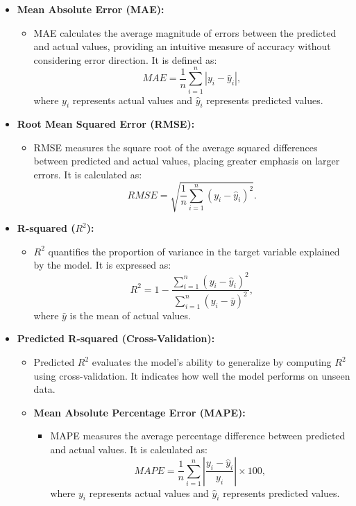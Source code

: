 \documentclass[10pt,twocolumn]{article}
\begin{document}
\begin{itemize}
    \item \textbf{Mean Absolute Error (MAE):}
    \begin{itemize}
        \item MAE calculates the average magnitude of errors between the predicted and actual values, providing an intuitive measure of accuracy without considering error direction. It is defined as:
        \[
        MAE = \frac{1}{n} \sum_{i=1}^n |y_i - \hat{y}_i|,
        \]
        where \( y_i \) represents actual values and \( \hat{y}_i \) represents predicted values.
    \end{itemize}

    \item \textbf{Root Mean Squared Error (RMSE):}
    \begin{itemize}
        \item RMSE measures the square root of the average squared differences between predicted and actual values, placing greater emphasis on larger errors. It is calculated as:
        \[
        RMSE = \sqrt{\frac{1}{n} \sum_{i=1}^n (y_i - \hat{y}_i)^2}.
        \]
    \end{itemize}

    \item \textbf{R-squared (\( R^2 \)):}
    \begin{itemize}
        \item  \( R^2 \) quantifies the proportion of variance in the target variable explained by the model. It is expressed as:
        \[
        R^2 = 1 - \frac{\sum_{i=1}^n (y_i - \hat{y}_i)^2}{\sum_{i=1}^n (y_i - \bar{y})^2},
        \]
        where \( \bar{y} \) is the mean of actual values.
    \end{itemize}

    \item \textbf{Predicted R-squared (Cross-Validation):}
    \begin{itemize}
        \item  Predicted \( R^2 \) evaluates the model's ability to generalize by computing \( R^2 \) using cross-validation. It indicates how well the model performs on unseen data.
    \end{itemize}
\begin{itemize}
    \item \textbf{Mean Absolute Percentage Error (MAPE):}
    \begin{itemize}
        \item  MAPE measures the average percentage difference between predicted and actual values. It is calculated as:
        \[
        MAPE = \frac{1}{n} \sum_{i=1}^n \left| \frac{y_i - \hat{y}_i}{y_i} \right| \times 100,
        \]
        where \( y_i \) represents actual values and \( \hat{y}_i \) represents predicted values.
    \end{itemize}


\end{itemize}
\end{itemize}
\end{document}
